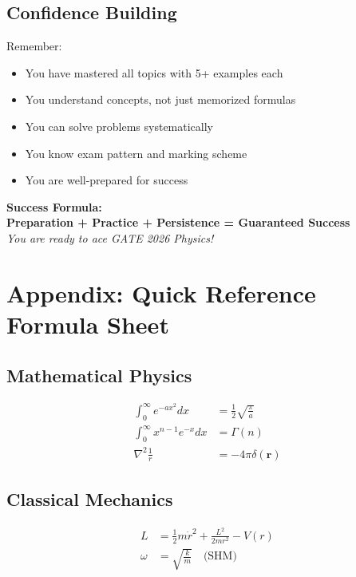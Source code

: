 \documentclass[12pt,a4paper]{article}
\begin{document}
\subsection{Confidence Building}

Remember:
\begin{itemize}
\item You have mastered all topics with 5+ examples each
\item You understand concepts, not just memorized formulas
\item You can solve problems systematically
\item You know exam pattern and marking scheme
\item You are well-prepared for success
\end{itemize}

\vspace{1cm}

\begin{center}
\Large\textbf{Success Formula:}\\
\vspace{0.5cm}
\textbf{Preparation + Practice + Persistence = Guaranteed Success}\\
\vspace{0.5cm}
\large\textit{You are ready to ace GATE 2026 Physics!}
\end{center}

\newpage

\section*{Appendix: Quick Reference Formula Sheet}

\subsection*{Mathematical Physics}
\begin{align}
\int_0^{\infty} e^{-ax^2} dx &= \frac{1}{2}\sqrt{\frac{\pi}{a}}\\
\int_0^{\infty} x^{n-1} e^{-x} dx &= \Gamma(n)\\
\nabla^2 \frac{1}{r} &= -4\pi\delta(\mathbf{r})
\end{align}

\subsection*{Classical Mechanics}
\begin{align}
L &= \frac{1}{2}m\dot{r}^2 + \frac{L^2}{2mr^2} - V(r)\\
\omega &= \sqrt{\frac{k}{m}} \quad \text{(SHM)}
\end{align}
\end{document}
